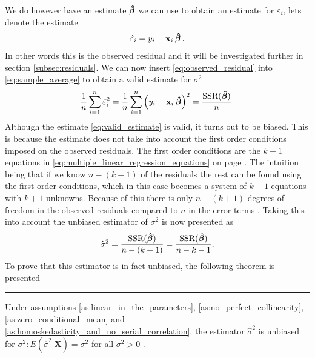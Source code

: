 We do however have an estimate $\operatorname{\boldsymbol{\hat{\beta}}}$ we can use to obtain an estimate for $\varepsilon_i$, lets denote the estimate
\begin{align}\label{eq:observed_residual}
    \hat{\varepsilon}_i = y_i - \mathbf{x}_i\operatorname{\boldsymbol{\hat{\beta}}}.
\end{align}
In other words this is the observed residual and it will be investigated further in section \ref{subsec:residuals}.
We can now insert \eqref{eq:observed_residual} into \eqref{eq:sample_average} to obtain a valid estimate for $\sigma^2$
\begin{align}\label{eq:valid_estimate}
    \dfrac{1}{n}\sum_{i=1}^n \hat{\varepsilon}_i^2 = \dfrac{1}{n}\sum_{i=1}^n \left(y_i - \mathbf{x}_i\operatorname{\boldsymbol{\hat{\beta}}}\right)^2 = \frac{\operatorname{\text{SSR}}(\operatorname{\boldsymbol{\hat{\beta}}})}{n}.
\end{align}
Although the estimate \eqref{eq:valid_estimate} is valid, it turns out to be biased.
This is because the estimate does not take into account the first order conditions imposed on the observed residuals.
The first order conditions are the $k + 1$ equations in \eqref{eq:multiple_linear_regression_equations} on page \pageref{eq:multiple_linear_regression_equations}.
The intuition being that if we know $n - (k + 1)$ of the residuals the rest can be found using the first order conditions, which in this case becomes a system of $k + 1$ equations with $k + 1$ unknowns. 
Because of this there is only $n - (k + 1)$ degrees of freedom in the observed residuals compared to $n$ in the error terms \cite[p. 55]{Wooldridge2012}.
Taking this into account the unbiased estimator of $\sigma^2$ is now presented as
\begin{align*}
    \hat{\sigma}^2 = \frac{\operatorname{\text{SSR}}(\operatorname{\boldsymbol{\hat{\beta}}})}{n - (k + 1)} = \frac{\operatorname{\text{SSR}}(\operatorname{\boldsymbol{\hat{\beta}}})}{n - k - 1}.
\end{align*}
To prove that this estimator is in fact unbiased, the following theorem is presented
\vspace{5mm}
\hrule
\vspace{5mm}
\begin{theorem}
    Under assumptions \ref{as:linear_in_the_parameters}, \ref{as:no_perfect_collinearity}, \ref{as:zero_conditional_mean} and \ref{as:homoskedasticity_and_no_serial_correlation}, the estimator $\hat{\sigma}^2$ is unbiased for $\sigma^2:E(\hat{\sigma}^2|\mathbf{X}) = \sigma^2$ for all $\sigma^2 > 0$ \cite[p. 813]{Wooldridge2012}.
\end{theorem}
